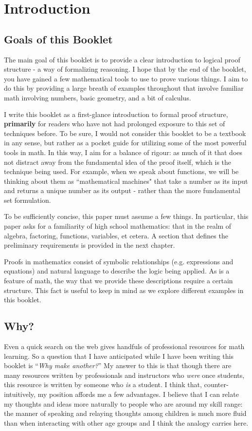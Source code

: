 \documentclass[../proofs.tex]{subfiles}
\begin{document}
\chapter{Introduction}
\section{Goals of this Booklet}
The main goal of this booklet is to provide a clear introduction to
logical proof structure - a way of formalizing reasoning. I hope that by the end of the
booklet, you have gained a few mathematical tools to use to prove various things.
I aim to do this by providing a large breath of examples throughout that involve familiar math
involving numbers, basic geometry, and a bit of calculus.

I write this booklet as a first-glance introduction to formal proof structure,
\textbf{primarily} for readers who have not had prolonged exposure to this set
of techniques before. To be sure, I would not consider this booklet to be a
textbook in any sense, but rather as a pocket guide for utilizing some of the
most powerful tools in math. In this way, I aim for a balance of rigour: as
much of it that does not distract away from the fundamental idea of the proof
itself, which is the technique being used. For example, when we speak about
functions, we will be thinking about them as ``mathematical machines" that
take a number as its input and returns a unique number as its output - rather
than the more fundamental set formulation.

To be sufficiently concise, this paper must assume a few things. In particular,
this paper asks for a familiarity of high school mathematics: that in the realm
of algebra, factoring, functions, variables, et cetera. A section that
defines the preliminary requirements is provided in the next chapter.

Proofs in mathematics consist of symbolic relationships (e.g. expressions and
equations) and natural language to describe the logic being applied. As is a
feature of math, the way that we provide these descriptions require a certain
structure. This fact is useful to keep in mind as we explore different examples
in this booklet.

\section{Why?}
Even a quick search on the web gives handfuls of professional resources for math learning. So a
question that I have anticipated while I have been writing this booklet is ``\emph{Why make
another?}'' My answer to this is that though there are many resources written by professionals
and instructors who \emph{were} once students, this resource is written by someone who \emph{is} a
student. I think that, counter-intuitively, my position affords me a few advantages. I believe
that I can relate my thoughts and ideas more naturally to people who are around my skill range:
the manner of speaking and relaying thoughts among children is much more fluid than when
interacting with other age groups and I think the analogy carries here. 
\end{document}
